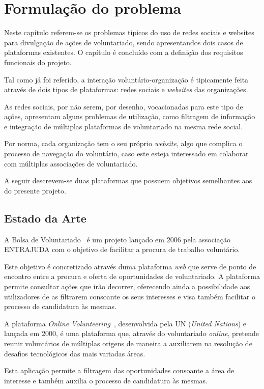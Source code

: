 \section{Formulação do problema}
Neste capítulo referem-se os problemas típicos do uso de redes sociais e websites para divulgação de ações de voluntariado, sendo apresentandos dois casos de plataformas existentes. O capítulo é concluído com a definição dos requisitos funcionais do projeto. \par \bigskip

Tal como já foi referido, a interação voluntário-organização é tipicamente feita através de dois tipos de plataformas: redes sociais e \textit{websites} das organizações. \par \bigskip

As redes sociais, por não serem, por desenho, vocacionadas para este tipo de ações, apresentam alguns problemas de utilização, como filtragem de informação e integração de múltiplas plataformas de voluntariado na mesma rede social. \par \bigskip

Por norma, cada organização tem o seu próprio \textit{website}, algo que complica o processo de navegação do voluntário, caso este esteja interessado em colaborar com múltiplas associações de voluntariado. \par \bigskip
A seguir descrevem-se duas plataformas que possuem objetivos semelhantes aos do presente projeto. \par \bigskip

\subsection{Estado da Arte}

A Bolsa de Voluntariado~\cite{bolsa_voluntariado} é um projeto lançado em 2006 pela associação ENTRAJUDA com o objetivo de facilitar a procura de trabalho voluntário.  \par \medskip
Este objetivo é concretizado através duma plataforma \textit{web} que serve de ponto de encontro entre a procura e oferta de oportunidades de voluntariado. A plataforma permite consultar ações que irão decorrer, oferecendo ainda a possibilidade aos utilizadores de as filtrarem consoante os seus interesses e visa também facilitar o processo de candidatura às mesmas. \par \bigskip

A plataforma \textit{Online Volunteering}~\cite{online_volunteering}, desenvolvida pela UN (\textit{United Nations}) e lançada em 2000, é uma plataforma que, através do voluntariado \textit{online}, pretende reunir voluntários de múltiplas origens de maneira a auxiliarem na resolução de desafios tecnológicos das mais variadas áreas.  \par \medskip
Esta aplicação permite a filtragem das oportunidades consoante a área de interesse e também auxilia o processo de candidatura às mesmas. \bigskip

